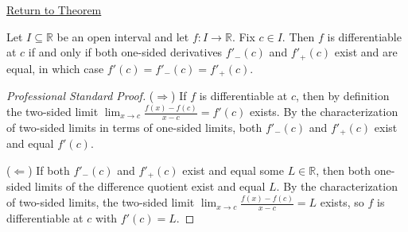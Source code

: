 \newpage
{}
\label{prf:differentiability-and-one-sided-derivatives}

\begin{remark*}[Return]
\hyperref[thm:differentiability-and-one-sided-derivatives]{Return to Theorem}
\end{remark*}

\begin{theorem*}
Let $I \subseteq \mathbb{R}$ be an open interval and let $f : I \to \mathbb{R}$. Fix $c \in I$. Then $f$ is differentiable at $c$ if and only if both one-sided derivatives $f'_-(c)$ and $f'_+(c)$ exist and are equal, in which case $f'(c) = f'_-(c) = f'_+(c)$.
\end{theorem*}

\begin{proof}[Professional Standard Proof]
\LRAProofBodyStart
($\Rightarrow$) If $f$ is differentiable at $c$, then by definition the two-sided limit $\lim_{x \to c} \frac{f(x) - f(c)}{x - c} = f'(c)$ exists. By the characterization of two-sided limits in terms of one-sided limits, both $f'_-(c)$ and $f'_+(c)$ exist and equal $f'(c)$.

($\Leftarrow$) If both $f'_-(c)$ and $f'_+(c)$ exist and equal some $L \in \mathbb{R}$, then both one-sided limits of the difference quotient exist and equal $L$. By the characterization of two-sided limits, the two-sided limit $\lim_{x \to c} \frac{f(x) - f(c)}{x - c} = L$ exists, so $f$ is differentiable at $c$ with $f'(c) = L$.
\end{proof}

